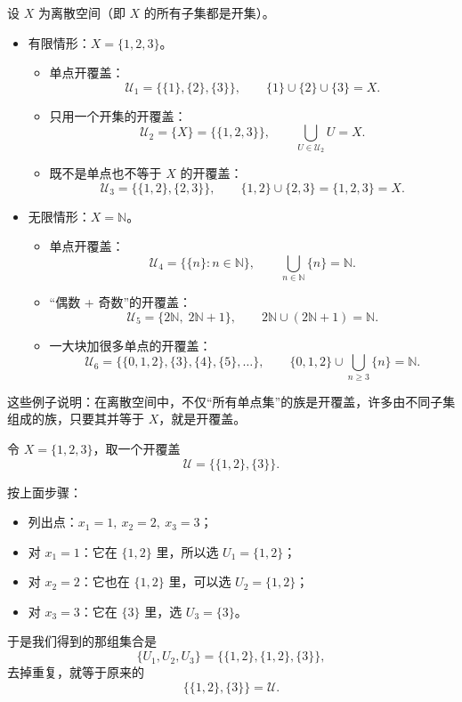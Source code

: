 \begin{example}[离散空间中的开覆盖示例]
设 $X$ 为离散空间（即 $X$ 的所有子集都是开集）。

\begin{itemize}
  \item[(1)] 有限情形：$X=\{1,2,3\}$。

  \begin{itemize}
    \item 单点开覆盖：
    \[
      \mathcal U_1=\bigl\{\{1\},\{2\},\{3\}\bigr\},\qquad
      \{1\}\cup\{2\}\cup\{3\}=X.
    \]

    \item 只用一个开集的开覆盖：
    \[
      \mathcal U_2=\{X\}=\bigl\{\{1,2,3\}\bigr\},\qquad
      \bigcup_{U\in\mathcal U_2}U=X.
    \]

    \item 既不是单点也不等于 $X$ 的开覆盖：
    \[
      \mathcal U_3=\bigl\{\{1,2\},\{2,3\}\bigr\},\qquad
      \{1,2\}\cup\{2,3\}=\{1,2,3\}=X.
    \]
  \end{itemize}

  \item[(2)] 无限情形：$X=\mathbb{N}$。

  \begin{itemize}
    \item 单点开覆盖：
    \[
      \mathcal U_4=\bigl\{\{n\}:n\in\mathbb N\bigr\},\qquad
      \bigcup_{n\in\mathbb N}\{n\}=\mathbb N.
    \]

    \item “偶数 + 奇数”的开覆盖：
    \[
      \mathcal U_5=\{2\mathbb N,\;2\mathbb N+1\},\qquad
      2\mathbb N\cup(2\mathbb N+1)=\mathbb N.
    \]

    \item 一大块加很多单点的开覆盖：
    \[
      \mathcal U_6=\bigl\{\{0,1,2\},\{3\},\{4\},\{5\},\dots\bigr\},\qquad
      \{0,1,2\}\cup\bigcup_{n\ge3}\{n\}=\mathbb N.
    \]
  \end{itemize}
\end{itemize}

这些例子说明：在离散空间中，不仅“所有单点集”的族是开覆盖，许多由不同子集组成的族，只要其并等于 $X$，就是开覆盖。
\end{example}
\begin{dxtips}[保证他有有限就行没说不能重复不能相交啊。]
    令 $X=\{1,2,3\}$，取一个开覆盖
\[
\mathcal U=\bigl\{\{1,2\},\{3\}\bigr\}.
\]

按上面步骤：
\begin{itemize}
  \item 列出点：$x_1=1,\ x_2=2,\ x_3=3$；
  \item 对 $x_1=1$：它在 $\{1,2\}$ 里，所以选 $U_1=\{1,2\}$；
  \item 对 $x_2=2$：它也在 $\{1,2\}$ 里，可以选 $U_2=\{1,2\}$；
  \item 对 $x_3=3$：它在 $\{3\}$ 里，选 $U_3=\{3\}$。
\end{itemize}

于是我们得到的那组集合是
\[
\{U_1,U_2,U_3\}
=\bigl\{\{1,2\},\{1,2\},\{3\}\bigr\},
\]
去掉重复，就等于原来的
\[
\bigl\{\{1,2\},\{3\}\bigr\}
=\mathcal U.
\]
\end{dxtips}
